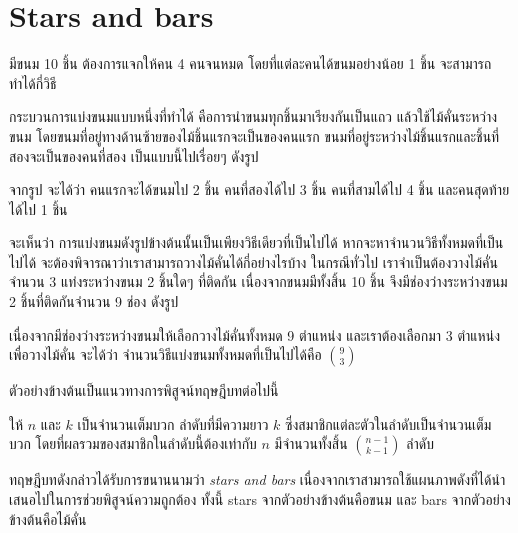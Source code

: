 \section{Stars and bars}
\begin{example}
มีขนม 10 ชิ้น ต้องการแจกให้คน 4 คนจนหมด โดยที่แต่ละคนได้ขนมอย่างน้อย 1 ชิ้น จะสามารถทำได้กี่วิธี

กระบวนการแบ่งขนมแบบหนึ่งที่ทำได้ คือการนำขนมทุกชิ้นมาเรียงกันเป็นแถว แล้วใช้ไม้คั่นระหว่างขนม โดยขนมที่อยู่ทางด้านซ้ายของไม้ชิ้นแรกจะเป็นของคนแรก ขนมที่อยู่ระหว่างไม้ชิ้นแรกและชิ้นที่สองจะเป็นของคนที่สอง เป็นแบบนี้ไปเรื่อยๆ ดังรูป
\begin{center}
\end{center}
จากรูป จะได้ว่า คนแรกจะได้ขนมไป 2 ชิ้น คนที่สองได้ไป 3 ชิ้น คนที่สามได้ไป 4 ชิ้น และคนสุดท้ายได้ไป 1 ชิ้น

จะเห็นว่า การแบ่งขนมดังรูปข้างต้นนั้นเป็นเพียงวิธีเดียวที่เป็นไปได้ \enskip หากจะหาจำนวนวิธีทั้งหมดที่เป็นไปได้ จะต้องพิจารณาว่าเราสามารถวางไม้คั่นได้กี่อย่างไรบ้าง \enskip ในกรณีทั่วไป เราจำเป็นต้องวางไม้คั่นจำนวน 3 แท่งระหว่างขนม 2 ชิ้นใดๆ ที่ติดกัน \enskip เนื่องจากขนมมีทั้งสิ้น 10 ชิ้น จึงมีช่องว่างระหว่างขนม 2 ชิ้นที่ติดกันจำนวน 9 ช่อง ดังรูป
\begin{center}
\end{center}
เนื่องจากมีช่องว่างระหว่างขนมให้เลือกวางไม้คั่นทั้งหมด 9 ตำแหน่ง และเราต้องเลือกมา 3 ตำแหน่งเพื่อวางไม้คั่น จะได้ว่า จำนวนวิธีแบ่งขนมทั้งหมดที่เป็นไปได้คือ $\binom{9}{3}$
\end{example}

ตัวอย่างข้างต้นเป็นแนวทางการพิสูจน์ทฤษฎีบทต่อไปนี้
\begin{theorem}
ให้ $n$ และ $k$ เป็นจำนวนเต็มบวก \enskip ลำดับที่มีความยาว $k$ ซึ่งสมาชิกแต่ละตัวในลำดับเป็นจำนวนเต็มบวก โดยที่ผลรวมของสมาชิกในลำดับนี้ต้องเท่ากับ $n$ มีจำนวนทั้งสิ้น $\binom{n-1}{k-1}$ ลำดับ
\end{theorem}
ทฤษฎีบทดังกล่าวได้รับการขนานนามว่า \emph{stars and bars} เนื่องจากเราสามารถใช้แผนภาพดังที่ได้นำเสนอไปในการช่วยพิสูจน์ความถูกต้อง \enskip ทั้งนี้ stars จากตัวอย่างข้างต้นคือขนม และ bars จากตัวอย่างข้างต้นคือไม้คั่น

